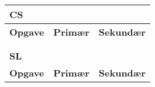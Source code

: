 \begin{table}[h]
\begin{tabular}{lll}
\multicolumn{3}{|l|}{\color{lblue} \textbf{\gls{CS}}}                                                                                                               \\ \hline
\multicolumn{1}{|l|}{\textbf{Opgave}}           & \multicolumn{1}{l|}{\textbf{Primær}}                       & \multicolumn{1}{l|}{\textbf{Sekundær}} \\ \hline
& & \\& & \\ \hline 


\multicolumn{3}{|l|}{\color{lblue} \textbf{\gls{SL}}}                                                                                                               \\ \hline
\multicolumn{1}{|l|}{\textbf{Opgave}}           & \multicolumn{1}{l|}{\textbf{Primær}}                       & \multicolumn{1}{l|}{\textbf{Sekundær}} \\ \hline


\end{tabular}
\end{table}